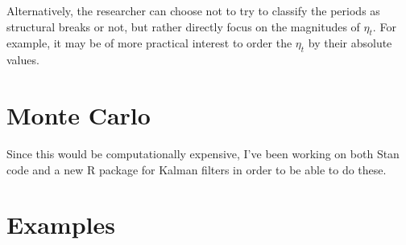 \documentclass{article}
\begin{document}
Alternatively, the researcher can choose not to try to classify the periods as structural breaks or not, but rather directly focus on the magnitudes of $\eta_{t}$.
For example, it may be of more practical interest to order the $\eta_{t}$ by their absolute values.

\section{Monte Carlo}
\label{sec:monte-carlo}

Since this would be computationally expensive, I've been working on both Stan code and a new R package for Kalman filters in order to be able to do these.

\section{Examples}
\label{sec:examples}


\end{document}
